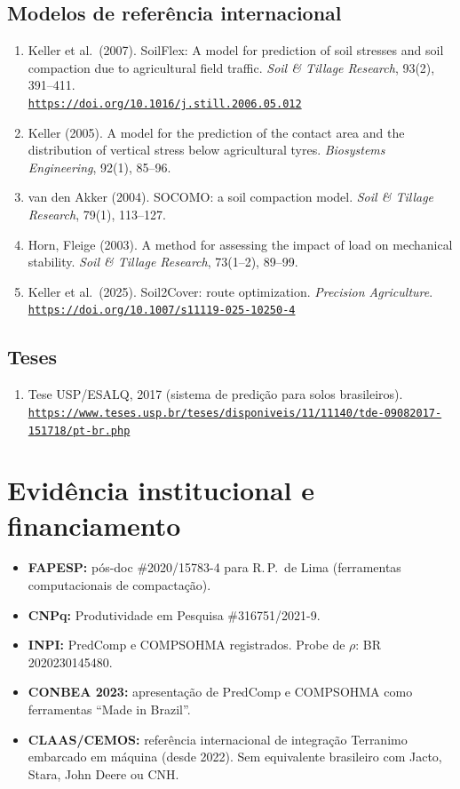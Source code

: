\documentclass[12pt,a4paper]{article}
\newcommand{\Section}[1]{\needspace{12\baselineskip}\section{#1}}
\newcommand{\SubsectionKeep}[1]{\needspace{10\baselineskip}\subsection{#1}}
\newcommand{\Link}[1]{\href{#1}{\nolinkurl{#1}}}
\newenvironment{NoBreakEnumerate}
{\begin{samepage}\begin{enumerate}}
{\end{enumerate}\end{samepage}}
\newenvironment{NoBreakItemize}
{\begin{samepage}\begin{itemize}}
{\end{itemize}\end{samepage}}
\begin{document}
\SubsectionKeep{Modelos de referência internacional}
\begin{NoBreakEnumerate}
  \item Keller et al.\ (2007). SoilFlex: A model for prediction of soil stresses and soil compaction due to agricultural field traffic. \textit{Soil \& Tillage Research}, 93(2), 391--411.\\
  \Link{https://doi.org/10.1016/j.still.2006.05.012}

  \item Keller (2005). A model for the prediction of the contact area and the distribution of vertical stress below agricultural tyres. \textit{Biosystems Engineering}, 92(1), 85--96.

  \item van den Akker (2004). SOCOMO: a soil compaction model. \textit{Soil \& Tillage Research}, 79(1), 113--127.

  \item Horn, Fleige (2003). A method for assessing the impact of load on mechanical stability. \textit{Soil \& Tillage Research}, 73(1--2), 89--99.

  \item Keller et al.\ (2025). Soil2Cover: route optimization. \textit{Precision Agriculture}.\\
  \Link{https://doi.org/10.1007/s11119-025-10250-4}
\end{NoBreakEnumerate}

\SubsectionKeep{Teses}
\begin{NoBreakEnumerate}
  \item Tese USP/ESALQ, 2017 (sistema de predição para solos brasileiros).\\
  \Link{https://www.teses.usp.br/teses/disponiveis/11/11140/tde-09082017-151718/pt-br.php}
\end{NoBreakEnumerate}

\Section{Evidência institucional e financiamento}
\begin{NoBreakItemize}
  \item \textbf{FAPESP:} pós-doc \#2020/15783-4 para R.\,P.\ de Lima (ferramentas computacionais de compactação).
  \item \textbf{CNPq:} Produtividade em Pesquisa \#316751/2021-9.
  \item \textbf{INPI:} PredComp e COMPSOHMA registrados. Probe de $\rho$: BR\,2020230145480.
  \item \textbf{CONBEA 2023:} apresentação de PredComp e COMPSOHMA como ferramentas ``Made in Brazil''.
  \item \textbf{CLAAS/CEMOS:} referência internacional de integração Terranimo embarcado em máquina (desde 2022). Sem equivalente brasileiro com Jacto, Stara, John Deere ou CNH.
\end{NoBreakItemize}
\end{document}
